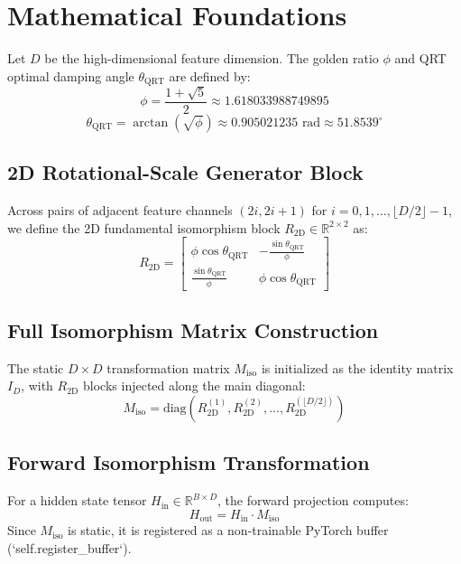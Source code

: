 \section{Mathematical Foundations}

Let $D$ be the high-dimensional feature dimension. The golden ratio $\phi$ and QRT optimal damping angle $\theta_{\text{QRT}}$ are defined by:
\begin{equation}
\phi = \frac{1 + \sqrt{5}}{2} \approx 1.618033988749895
\end{equation}
\begin{equation}
\theta_{\text{QRT}} = \arctan(\sqrt{\phi}) \approx 0.905021235 \text{ rad} \approx 51.8539^\circ
\end{equation}

\subsection{2D Rotational-Scale Generator Block}
Across pairs of adjacent feature channels $(2i, 2i+1)$ for $i=0, 1, \dots, \lfloor D/2 \rfloor - 1$, we define the 2D fundamental isomorphism block $R_{2\text{D}} \in \mathbb{R}^{2 \times 2}$ as:
\begin{equation}
R_{2\text{D}} = \begin{bmatrix}
\phi \cos\theta_{\text{QRT}} & -\frac{\sin\theta_{\text{QRT}}}{\phi} \\[0.5em]
\frac{\sin\theta_{\text{QRT}}}{\phi} & \phi \cos\theta_{\text{QRT}}
\end{bmatrix}
\end{equation}

\subsection{Full Isomorphism Matrix Construction}
The static $D \times D$ transformation matrix $M_{\text{iso}}$ is initialized as the identity matrix $I_D$, with $R_{2\text{D}}$ blocks injected along the main diagonal:
\begin{equation}
M_{\text{iso}} = \text{diag}\left( R_{2\text{D}}^{(1)}, R_{2\text{D}}^{(2)}, \dots, R_{2\text{D}}^{(\lfloor D/2 \rfloor)} \right)
\end{equation}

\subsection{Forward Isomorphism Transformation}
For a hidden state tensor $H_{\text{in}} \in \mathbb{R}^{B \times D}$, the forward projection computes:
\begin{equation}
H_{\text{out}} = H_{\text{in}} \cdot M_{\text{iso}}
\end{equation}
Since $M_{\text{iso}}$ is static, it is registered as a non-trainable PyTorch buffer (`self.register_buffer`).
